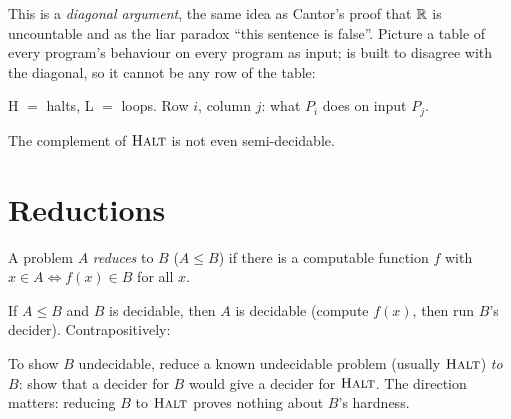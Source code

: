 This is a \emph{diagonal argument}, the same idea as Cantor's proof that $\mathbb{R}$ is
uncountable and as the liar paradox ``this sentence is false''.
Picture a table of every program's behaviour on every program as input; 
is built to disagree with the diagonal, so it cannot be any row of the table:
\begin{center}

\small H $=$ halts, L $=$ loops. Row $i$, column $j$: what $P_i$ does on input $P_j$.
\end{center}

\begin{corollary}
The complement of $\textsc{Halt}$ is not even semi-decidable.
\end{corollary}

\section{Reductions}

\begin{definition}
A problem $A$ \emph{reduces} to $B$ ($A\le B$) if there is a computable function $f$ with
$x\in A\iff f(x)\in B$ for all $x$.
\end{definition}

If $A\le B$ and $B$ is decidable, then $A$ is decidable (compute $f(x)$, then run $B$'s
decider). Contrapositively:

\begin{important}
To show $B$ undecidable, reduce a known undecidable problem (usually $\textsc{Halt}$)
\emph{to} $B$: show that a decider for $B$ would give a decider for $\textsc{Halt}$.
The direction matters: reducing $B$ to $\textsc{Halt}$ proves nothing about $B$'s
hardness.
\end{important}

